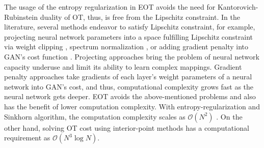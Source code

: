 \begin{remark}

The usage of the entropy regularization in EOT avoids the need for Kantorovich-Rubinstein duality
of OT, thus, is free from the Lipschitz constraint. In the literature, several methods endeavor to
satisfy Lipschitz constraint, for example, projecting neural network
parameters into a space fulfilling Lipschitz constraint via weight
clipping \cite{2017arXiv170107875A}, spectrum
normalization \cite{2018arXiv180205957M}, or adding gradient 
penalty into GAN's cost function \cite{2017arXiv170400028G}. Projecting
approaches bring the problem of neural network capacity underuse and
limit its ability to learn complex mappings. Gradient penalty approaches take
gradients of each layer's weight parameters of a neural network into
GAN's cost, and thus, computational complexity grows fast as the neural
network gets deeper. 
EOT avoids the above-mentioned problems and also has the benefit of lower
computation complexity. With entropy-regularization and Sinkhorn
algorithm, the computation complexity scales as $\mathcal{O}(N^2)$ \cite{2013arXiv1306.0895C}. 
On the other hand, solving OT cost using interior-point methods has a computational requirement as 
$\mathcal{O}(N^3\log{N})$. 

\end{remark}

